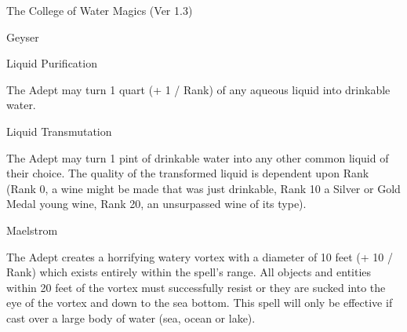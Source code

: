 \begin{Chapter}{The College of Water Magics (Ver 1.3)}
\begin{spell}[S-4]{Geyser }
\begin{effects}
\end{effects}
\end{spell}

\begin{spell}[S-5]{Liquid Purification }

\begin{effects}
The Adept may turn 1 quart (+ 1 / Rank) of 
any aqueous liquid into drinkable water. 




\end{effects}
\end{spell}

\begin{spell}[S-6]{Liquid Transmutation }

\begin{effects}
 The  Adept  may  turn  1  pint  of  drinkable 
water into any other common liquid of their choice. 
The quality of the transformed liquid is dependent 
upon  Rank  (Rank  0,  a  wine  might  be  made  that 
was just drinkable, Rank 10 a Silver or Gold Medal 
young  wine,  Rank  20,  an  unsurpassed  wine  of  its 
type). 



\end{effects}
\end{spell}

\begin{spell}[S-7]{Maelstrom }

\begin{effects}
 The  Adept  creates  a  horrifying  watery 
vortex  with  a  diameter  of  10  feet  (+  10  /  Rank) 
which  exists  entirely  within  the  spell’s  range.  All 
objects  and  entities  within  20  feet  of  the  vortex 
must successfully resist or they are sucked into the 
eye of the vortex and down to the sea bottom. This 
spell will only be effective if cast over a large body 
of water (sea, ocean or lake). 

\end{effects}
\end{spell}


\end{Chapter}
